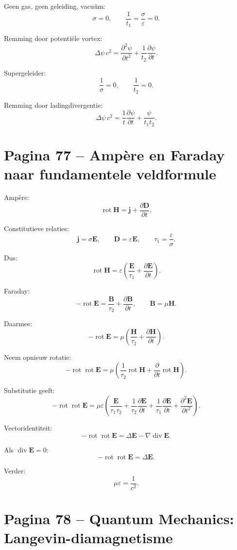 \documentclass[11pt,a4paper]{article}
\newcommand{\vect}[1]{\mathbf{#1}}
\newcommand{\rot}{\operatorname{rot}}
\newcommand{\Div}{\operatorname{div}}
\newcommand{\grad}{\nabla}
\begin{document}
Geen gas, geen geleiding, vacuüm:
$$
\sigma=0,
\qquad
\frac{1}{t_1}
=
\frac{\sigma}{\varepsilon}
=
0.
$$

Remming door potentiële vortex:
$$
\Delta\psi\,c^{2}
=
\frac{\partial^{2}\psi}{\partial t^{2}}
+
\frac{1}{t_2}
\frac{\partial\psi}{\partial t}.
$$

Supergeleider:
$$
\frac{1}{\sigma}=0,
\qquad
\frac{1}{t_2}=0.
$$

Remming door ladingdivergentie:
$$
\Delta\psi\,c^{2}
=
\frac{1}{t}
\frac{\partial\psi}{\partial t}
+
\frac{\psi}{t_1t_2}.
$$

\section*{Pagina 77 -- Ampère en Faraday naar fundamentele veldformule}

Ampère:
$$
\rot\vect{H}
=
\vect{j}
+
\frac{\partial\vect{D}}{\partial t}.
$$

Constitutieve relaties:
$$
\vect{j}=\sigma\vect{E},
\qquad
\vect{D}=\varepsilon\vect{E},
\qquad
\tau_1=\frac{\varepsilon}{\sigma}.
$$

Dus:
$$
\rot\vect{H}
=
\varepsilon
\left(
\frac{\vect{E}}{\tau_1}
+
\frac{\partial\vect{E}}{\partial t}
\right).
$$

Faraday:
$$
-\rot\vect{E}
=
\frac{\vect{B}}{\tau_2}
+
\frac{\partial\vect{B}}{\partial t},
\qquad
\vect{B}=\mu\vect{H}.
$$

Daarmee:
$$
-\rot\vect{E}
=
\mu
\left(
\frac{\vect{H}}{\tau_2}
+
\frac{\partial\vect{H}}{\partial t}
\right).
$$

Neem opnieuw rotatie:
$$
-\rot\rot\vect{E}
=
\mu
\left(
\frac{1}{\tau_2}\rot\vect{H}
+
\frac{\partial}{\partial t}\rot\vect{H}
\right).
$$

Substitutie geeft:
$$
-\rot\rot\vect{E}
=
\mu\varepsilon
\left(
\frac{\vect{E}}{\tau_1\tau_2}
+
\frac{1}{\tau_2}
\frac{\partial\vect{E}}{\partial t}
+
\frac{1}{\tau_1}
\frac{\partial\vect{E}}{\partial t}
+
\frac{\partial^{2}\vect{E}}{\partial t^{2}}
\right).
$$

Vectoridentiteit:
$$
-\rot\rot\vect{E}
=
\Delta\vect{E}
-
\grad\Div\vect{E}.
$$

Als $\Div\vect{E}=0$:
$$
-\rot\rot\vect{E}
=
\Delta\vect{E}.
$$

Verder:
$$
\mu\varepsilon=\frac{1}{c^{2}}.
$$

\section*{Pagina 78 -- Quantum Mechanics: Langevin-diamagnetisme}
\end{document}
